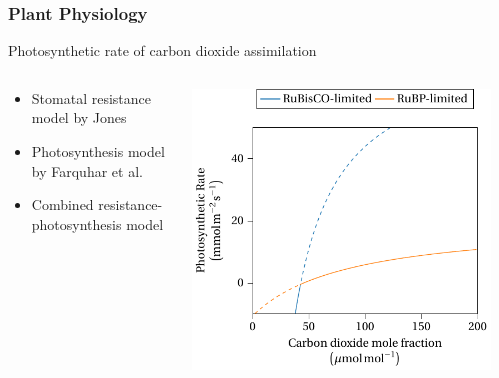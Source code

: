 \begin{frame}
    \frametitle{Plant Physiology}
    \begin{center}
        Photosynthetic rate of carbon dioxide assimilation
    \end{center}
    \begin{columns}
        \begin{column}{0.4\textwidth}
            \begin{itemize}
                \item<2-> Stomatal resistance model by Jones \cite{Jones1999}
                \item<3-> Photosynthesis model by Farquhar et al. \cite{Farquhar1980}
                \item<4> Combined resistance-photosynthesis model
            \end{itemize}
        \end{column}
        \begin{column}{0.6\textwidth}
            \vspace{0.5cm}
            \begin{columns}
                \begin{column}{0.3\textwidth}
                    \includegraphics[scale=0.33]{figures/photosynthesis.pdf}
                \end{column}
                \begin{column}{0.3\textwidth}
\end{column}
\end{columns}
\end{column}
\end{columns}
\end{frame}
